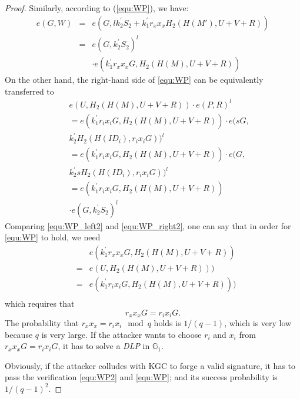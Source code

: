 \documentclass[letterpaper,12pt]{article}
\begin{document}
\begin{proof}
Similarly,  according to (\ref{equ:WP}), we have:
\begin{eqnarray} \label{equ:WP_left2}
e(G, W)&=&e(G, lk_2^{\prime}S_2+ k_1^{\prime}r_xx_x H_2(H(M'), U+V+R))\nonumber\\
&=&e(G, k_2^\prime S_2)^{l}\nonumber\\
&& \cdot e(k_1^{\prime}r_xx_x G, H_2(H(M), U+V+R))
\end{eqnarray}
On the other hand, the right-hand side of \eqref{equ:WP} can be equivalently transferred to
\begin{eqnarray}\label{equ:WP_right2}
&&e(U, H_2(H(M), U+V+R))\cdot e(P, R)^{l} \nonumber\\
&&=e(k_1^\prime r_ix_iG, H_2(H(M),U+V+R))\cdot e( sG, \nonumber\\
&& k_2^\prime H_2(H(ID_i), r_ix_iG))^{l} \nonumber\\
&&=e(k_1^\prime r_ix_iG, H_2(H(M), U+V+R))\cdot e(G, \nonumber\\
&&k_2^\prime sH_2(H(ID_i), r_ix_iG))^l \nonumber\\
&&=e(k_1^\prime r_ix_iG, H_2(H(M),U+V+R)) \nonumber\\
&&\cdot e(G, k_2^\prime S_2)^l
\end{eqnarray}
Comparing  \eqref{equ:WP_left2} and \eqref{equ:WP_right2}, one can say that in order for \eqref{equ:WP} to hold, we need
\begin{eqnarray*}
 && e(k_1^{\prime}r_xx_x G, H_2(H(M), U+V+R))\\
 &= & e(U, H_2(H(M), U+V+R)))\\
 &= & e(k_1^\prime r_ix_i G, H_2(H(M), U+V+R)))\\
\end{eqnarray*}
which requires that
$$r_xx_x G=r_ix_i G.$$
The probability that $r_xx_x=r_ix_i \mod q$ holds is $1/(q-1)$, which is very low because $q$ is very large. If the attacker wants to choose $r_i$ and $x_i$ from $r_xx_x G=r_ix_i G$, it has to solve a \emph{DLP} in $\mathbb{G}_1$.

Obviously, if the attacker colludes with KGC to forge a valid signature, it has to pass the verification  \eqref{equ:WP2} and \eqref{equ:WP}; and its success probability is $1/(q-1)^2$.
\end{proof}
\end{document}

